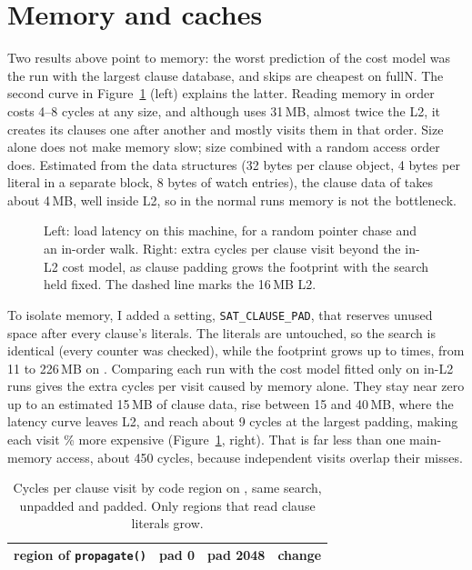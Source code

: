 \section{Memory and caches}
\label{sec:memory}

Two results above point to memory: the worst prediction of the cost model was
the run with the largest clause database, and skips are cheapest on fullN. The
second curve in Figure~\ref{fig:memory} (left) explains the latter. Reading
memory in order costs 4--8 cycles at any size, and although  uses
31\,MB, almost twice the L2, it creates its clauses one after another and
mostly visits them in that order. Size alone does not make memory slow; size
combined with a random access order does. Estimated from the data structures
(32 bytes per clause object, 4 bytes per literal in a separate block, 8 bytes
of watch entries), the clause data of  takes about 4\,MB, well
inside L2, so in the normal runs memory is not the bottleneck.

\begin{figure}[ht]
\centering
{}
\caption{Left: load latency on this machine, for a random pointer chase and an
in-order walk. Right: extra cycles per clause visit beyond the in-L2 cost
model, as clause padding grows the footprint with the search held fixed. The
dashed line marks the 16\,MB L2.}
\label{fig:memory}
\end{figure}

To isolate memory, I added a setting, \texttt{SAT\_CLAUSE\_PAD}, that reserves
unused space after every clause's literals. The literals are untouched, so the
search is identical (every counter was checked), while the footprint grows up
to \numPadFootprint{} times, from 11 to 226\,MB on . Comparing
each run with the cost model fitted only on in-L2 runs gives the extra cycles
per visit caused by memory alone. They stay near zero up to an estimated
15\,MB of clause data, rise between 15 and 40\,MB, where the latency curve
leaves L2, and reach about 9 cycles at the largest padding, making each visit
\numPadSlowdown\% more expensive (Figure~\ref{fig:memory}, right). That is far
less than one main-memory access, about 450 cycles, because independent visits
overlap their misses.

\begin{table}[ht]
\centering\small
\begin{tabular}{lrrr}
\toprule
region of \texttt{propagate()} & pad 0 & pad 2048 & change \\
\midrule

\end{tabular}
\caption{Cycles per clause visit by code region on , same
search, unpadded and padded. Only regions that read clause literals grow.}
\label{tab:shift}
\end{table}

